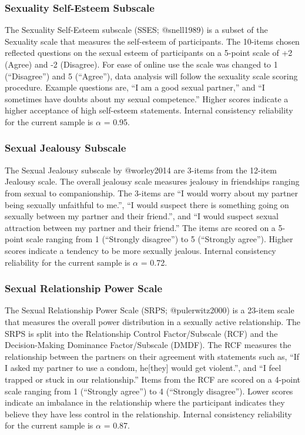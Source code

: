 \documentclass[
]{article}
\begin{document}
\hypertarget{sexuality-self-esteem-subscale}{%
\subsubsection{Sexuality Self-Esteem
Subscale}\label{sexuality-self-esteem-subscale}}

The Sexuality Self-Esteem subscale (SSES; @snell1989) is a subset of the
Sexuality scale that measures the self-esteem of participants. The
10-items chosen reflected questions on the sexual esteem of participants
on a 5-point scale of +2 (Agree) and -2 (Disagree). For ease of online
use the scale was changed to 1 (``Disagree'') and 5 (``Agree''), data
analysis will follow the sexuality scale scoring procedure. Example
questions are, ``I am a good sexual partner,'' and ``I sometimes have
doubts about my sexual competence.'' Higher scores indicate a higher
acceptance of high self-esteem statements. Internal consistency
reliability for the current sample is \(\alpha\) = 0.95.

\hypertarget{sexual-jealousy-subscale}{%
\subsubsection{Sexual Jealousy
Subscale}\label{sexual-jealousy-subscale}}

The Sexual Jealousy subscale by @worley2014 are 3-items from the 12-item
Jealousy scale. The overall jealousy scale measures jealousy in
friendships ranging from sexual to companionship. The 3-items are ``I
would worry about my partner being sexually unfaithful to me.'', ``I
would suspect there is something going on sexually between my partner
and their friend.'', and ``I would suspect sexual attraction between my
partner and their friend.'' The items are scored on a 5-point scale
ranging from 1 (``Strongly disagree'') to 5 (``Strongly agree''). Higher
scores indicate a tendency to be more sexually jealous. Internal
consistency reliability for the current sample is \(\alpha\) = 0.72.

\hypertarget{sexual-relationship-power-scale}{%
\subsubsection{Sexual Relationship Power
Scale}\label{sexual-relationship-power-scale}}

The Sexual Relationship Power Scale (SRPS; @pulerwitz2000) is a 23-item
scale that measures the overall power distribution in a sexually active
relationship. The SRPS is split into the Relationship Control
Factor/Subscale (RCF) and the Decision-Making Dominance Factor/Subscale
(DMDF). The RCF measures the relationship between the partners on their
agreement with statements such as, ``If I asked my partner to use a
condom, he{[}they{]} would get violent.'', and ``I feel trapped or stuck
in our relationship.'' Items from the RCF are scored on a 4-point scale
ranging from 1 (``Strongly agree'') to 4 (``Strongly disagree''). Lower
scores indicate an imbalance in the relationship where the participant
indicates they believe they have less control in the relationship.
Internal consistency reliability for the current sample is \(\alpha\) =
0.87.
\end{document}
